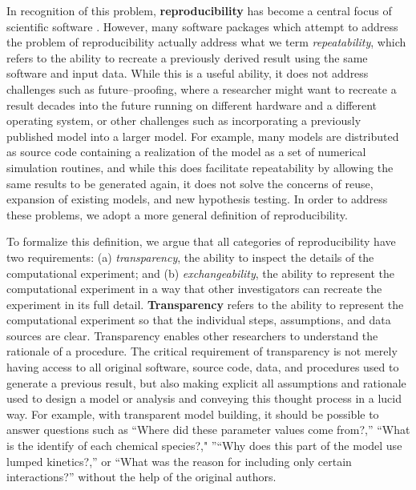 \documentclass[10pt,letterpaper]{article}
\begin{document}
In recognition of this problem, \textbf{reproducibility} has become a central focus of scientific software \cite{peng2011reproducible,sandve2013ten}. However, many software packages which attempt to address the problem of reproducibility actually address what we term \textit{repeatability}, which refers to the ability to recreate a previously derived result using the same software and input data. While this is a useful ability, it does not address challenges such as future--proofing, where a researcher might want to recreate a result decades into the future running on different hardware and a different operating system, or other challenges such as incorporating a previously published model into a larger model. For example, many models are distributed as source code containing a realization of the model as a set of numerical simulation routines, and while this does facilitate repeatability by allowing the same results to be generated again, it does not solve the concerns of reuse, expansion of existing models, and new hypothesis testing. In order to address these problems, we adopt a more general definition of reproducibility.

To formalize this definition, we argue that all categories of reproducibility have two requirements: (a) \textit{transparency}, the ability to inspect the details of the computational experiment; and (b) \textit{exchangeability}, the ability to represent the computational experiment in a way that other investigators can recreate the experiment in its full detail.
\textbf{Transparency} refers to the ability to represent the computational experiment so that the individual steps, assumptions, and data sources are clear. Transparency enables other researchers to understand the rationale of a procedure. The critical requirement of transparency is not merely having access to all original software, source code, data, and procedures used to generate a previous result, but also making explicit all assumptions and rationale used to design a model or analysis and conveying this thought process in a lucid way. For example, with transparent model building, it should be possible to answer questions such as ``Where did these parameter values come from?,''  ``What is the identify of each chemical species?," ''``Why does this part of the model use lumped kinetics?,'' or ``What was the reason for including only certain interactions?'' without the help of the original authors.
\end{document}
